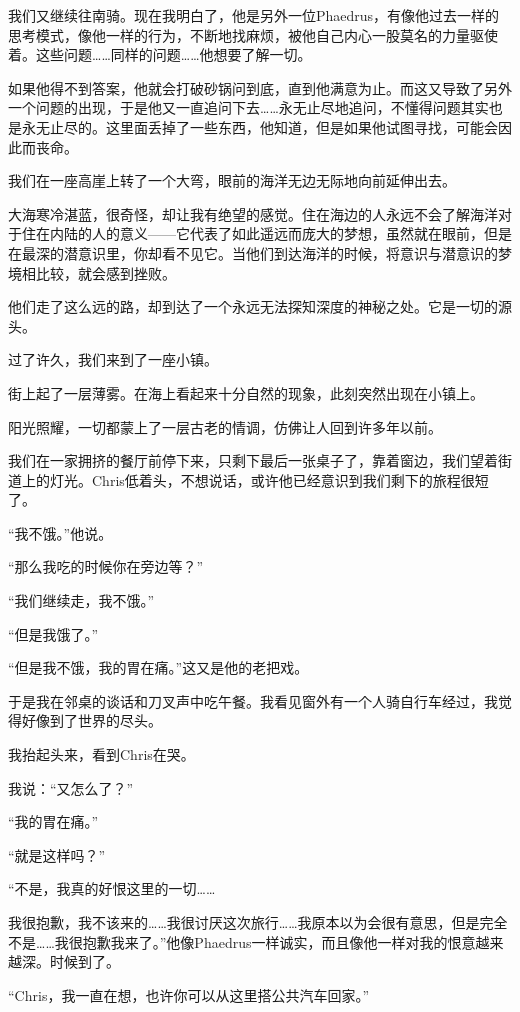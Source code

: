 \documentclass[UTF8]{article}
\begin{document}
\par 我们又继续往南骑。现在我明白了，他是另外一位Phaedrus，有像他过去一样的思考模式，像他一样的行为，不断地找麻烦，被他自己内心一股莫名的力量驱使着。这些问题……同样的问题……他想要了解一切。
\par 如果他得不到答案，他就会打破砂锅问到底，直到他满意为止。而这又导致了另外一个问题的出现，于是他又一直追问下去……永无止尽地追问，不懂得问题其实也是永无止尽的。这里面丢掉了一些东西，他知道，但是如果他试图寻找，可能会因此而丧命。
\par 我们在一座高崖上转了一个大弯，眼前的海洋无边无际地向前延伸出去。
\par 大海寒冷湛蓝，很奇怪，却让我有绝望的感觉。住在海边的人永远不会了解海洋对于住在内陆的人的意义——它代表了如此遥远而庞大的梦想，虽然就在眼前，但是在最深的潜意识里，你却看不见它。当他们到达海洋的时候，将意识与潜意识的梦境相比较，就会感到挫败。
\par 他们走了这么远的路，却到达了一个永远无法探知深度的神秘之处。它是一切的源头。
\par 过了许久，我们来到了一座小镇。
\par 街上起了一层薄雾。在海上看起来十分自然的现象，此刻突然出现在小镇上。
\par 阳光照耀，一切都蒙上了一层古老的情调，仿佛让人回到许多年以前。
\par 我们在一家拥挤的餐厅前停下来，只剩下最后一张桌子了，靠着窗边，我们望着街道上的灯光。Chris低着头，不想说话，或许他已经意识到我们剩下的旅程很短了。
\par “我不饿。”他说。
\par “那么我吃的时候你在旁边等？”
\par “我们继续走，我不饿。”
\par “但是我饿了。”
\par “但是我不饿，我的胃在痛。”这又是他的老把戏。
\par 于是我在邻桌的谈话和刀叉声中吃午餐。我看见窗外有一个人骑自行车经过，我觉得好像到了世界的尽头。
\par 我抬起头来，看到Chris在哭。
\par 我说：“又怎么了？”
\par “我的胃在痛。”
\par “就是这样吗？”
\par “不是，我真的好恨这里的一切……
\par 我很抱歉，我不该来的……我很讨厌这次旅行……我原本以为会很有意思，但是完全不是……我很抱歉我来了。”他像Phaedrus一样诚实，而且像他一样对我的恨意越来越深。时候到了。
\par “Chris，我一直在想，也许你可以从这里搭公共汽车回家。”
\end{document}
